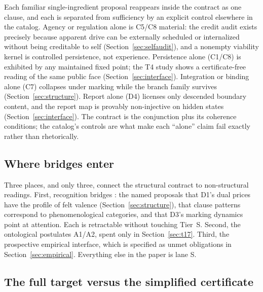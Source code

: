 Each familiar single-ingredient proposal reappears inside the contract as one
clause, and each is separated from sufficiency by an explicit control
elsewhere in the catalog. Agency or regulation alone is C5/C8 material:
the credit audit exists precisely because apparent drive can be externally
scheduled or internalized without being creditable to self
(Section~\ref{sec:selfaudit}), and a nonempty viability kernel is controlled
persistence, not experience. Persistence alone (C1/C8) is exhibited by any
maintained fixed point; the T4 study shows a certificate-free reading of the
same public face (Section~\ref{sec:interface}). Integration or binding alone
(C7) collapses under marking while the branch family survives
(Section~\ref{sec:structure}). Report alone (D4) licenses only descended
boundary content, and the report map is provably non-injective on hidden
states (Section~\ref{sec:interface}). The contract is the conjunction plus its
coherence conditions; the catalog's controls are what make each ``alone''
claim fail exactly rather than rhetorically.

\subsection{Where bridges enter}

Three places, and only three, connect the structural contract to
non-structural readings. First, recognition bridges \gradeR{}: the named
proposals that D1's dual prices have the profile of felt valence
(Section~\ref{sec:structure}), that clause patterns correspond to
phenomenological categories, and that D3's marking dynamics point at
attention. Each is retractable without touching Tier~S. Second, the
ontological postulates A1/A2, spent only in Section~\ref{sec:t17}. Third, the
prospective empirical interface, which is specified as unmet obligations in
Section~\ref{sec:empirical}. Everything else in the paper is lane S.

\subsection{The full target versus the simplified certificate}
\label{sec:fullvssimp}

